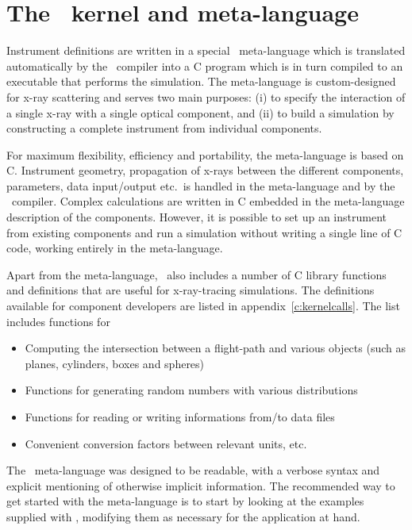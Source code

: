 
\chapter{The \MCX\ kernel and meta-language}
\label{s:kernel}

Instrument definitions are written in a special \MCX\ meta-language which
is translated automatically by the \MCX\ compiler into a C program
which is in turn compiled to an executable that
performs the simulation. The meta-language is custom-designed for x-ray
scattering and serves two main purposes: (i) to specify the interaction of a
single x-ray with a single optical component, and (ii) to build a
simulation by constructing a complete instrument from individual
components.

For maximum flexibility, efficiency and portability, the meta-language is based on C.
Instrument geometry, propagation of x-rays between the different
components, parameters, data input/output etc.\ is handled in the
meta-language and by the \MCX\ compiler. Complex calculations are written in
C embedded in the meta-language description of the
components. However, it is
possible to set up an instrument from existing components and
run a simulation without writing a single line of C code, working
entirely in the meta-language.

Apart from the meta-language, \MCX\ also includes a number of C library
functions and definitions that are useful for x-ray-tracing
simulations. The definitions available for component developers are
listed in appendix~\ref{c:kernelcalls}. The list includes functions
for
\begin{itemize}
\item Computing the intersection between a flight-path and various
  objects (such as planes, cylinders, boxes and spheres)
\item Functions for generating random numbers
with various distributions
\item Functions for reading or writing informations from/to data
  files
\item Convenient conversion factors between relevant units, etc.
\end{itemize}

The \MCX\ meta-language was designed to be readable, with a verbose
syntax and explicit mentioning of otherwise implicit information. The
recommended way to get started with the meta-language is to start by
looking at the examples supplied with \MCX, modifying them as necessary
for the application at hand.


